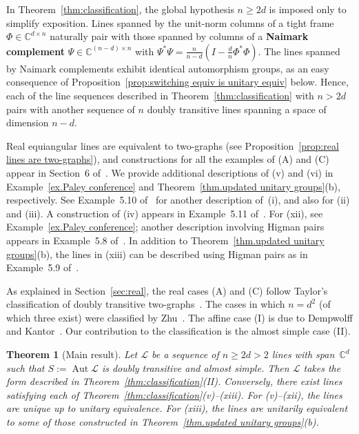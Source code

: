 \documentclass[11pt]{article}
\newtheorem{theorem}[theo]{Theorem}
\theoremstyle{definition}
\numberwithin{equation}{section}
\begin{document}
In Theorem~\ref{thm:classification}, the global hypothesis $n\geq 2d$ is imposed only to simplify exposition.
Lines spanned by the unit-norm columns of a tight frame $\Phi \in \mathbb{C}^{d \times n}$ naturally pair with those spanned by columns of a \textbf{Naimark complement} $\Psi \in \mathbb{C}^{(n-d) \times n}$ with 
$\Psi^* \Psi = \frac{n}{n-d}(I - \frac{d}{n} \Phi^* \Phi)$.
The lines spanned by Naimark complements exhibit identical automorphism groups, as an easy consequence of Proposition~\ref{prop:switching equiv is unitary equiv} below.
Hence, each of the line sequences described in Theorem~\ref{thm:classification} with $n>2d$ pairs with another sequence of $n$ doubly transitive lines spanning a space of dimension $n-d$.

Real equiangular lines are equivalent to two-graphs (see Proposition~\ref{prop:real lines are two-graphs}), and constructions for all the examples of (A) and (C) appear in Section~6 of~\cite{Taylor:77}.
We provide additional descriptions of (v) and (vi) in Example~\ref{ex.Paley conference} and Theorem~\ref{thm.updated unitary groups}(b), respectively.
See Example~5.10 of~\cite{IversonM:18} for another description of~(i), and also for (ii) and (iii).
A construction of (iv) appears in Example~5.11 of~\cite{IversonM:18}.
For (xii), see Example~\ref{ex.Paley conference}; another description involving Higman pairs appears in Example~5.8 of~\cite{IversonM:18}.
In addition to Theorem~\ref{thm.updated unitary groups}(b), the lines in (xiii) can be described using Higman pairs as in Example~5.9 of~\cite{IversonM:18}.


As explained in Section~\ref{sec:real}, the real cases (A) and (C) follow Taylor's classification of doubly transitive two-graphs~\cite{Taylor:92}.
The cases in which $n=d^2$ (of which three exist) were classified by Zhu~\cite{Zhu:15}.
The affine case (I) is due to Dempwolff and Kantor~\cite{DempwolffK:23}.
Our contribution to the classification is the almost simple case (II).

\begin{theorem}[Main result]
\label{thm:main result}
Let $\mathscr{L}$ be a sequence of $n\geq 2d > 2$ lines with span~$\mathbb{C}^d$ such that $S := \operatorname{Aut} \mathscr{L}$ is doubly transitive and almost simple.
Then $\mathscr{L}$ takes the form described in Theorem~\ref{thm:classification}(II).
Conversely, there exist lines satisfying each of Theorem~\ref{thm:classification}(v)--(xiii). 
For (v)--(xii), the lines are unique up to unitary equivalence.
For (xiii), the lines are unitarily equivalent to some of those constructed in Theorem~\ref{thm.updated unitary groups}(b).
\end{theorem}
\end{document}
